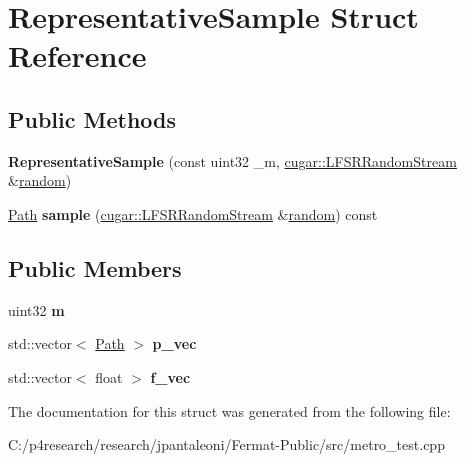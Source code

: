 \hypertarget{struct_representative_sample}{}\section{Representative\+Sample Struct Reference}
\label{struct_representative_sample}
\subsection*{Public Methods}
\begin{DoxyCompactItemize}
\item 
\mbox{\label{struct_representative_sample_a842ca3910b873725a562ff87373a0ad6}} 
{\bfseries Representative\+Sample} (const uint32 \+\_\+m, \hyperlink{structcugar_1_1_l_f_s_r_random_stream}{cugar\+::\+L\+F\+S\+R\+Random\+Stream} \&\hyperlink{group___sampling_module_gaec17bbbfd36295353081b7b4480d933d}{random})
\item 
\mbox{\label{struct_representative_sample_afc654849bcc19946b094c00f4381c99c}} 
\hyperlink{struct_path}{Path} {\bfseries sample} (\hyperlink{structcugar_1_1_l_f_s_r_random_stream}{cugar\+::\+L\+F\+S\+R\+Random\+Stream} \&\hyperlink{group___sampling_module_gaec17bbbfd36295353081b7b4480d933d}{random}) const
\end{DoxyCompactItemize}
\subsection*{Public Members}
\begin{DoxyCompactItemize}
\item 
\mbox{\label{struct_representative_sample_a59b60acbfdb408e987a3ca95f0f70ed2}} 
uint32 {\bfseries m}
\item 
\mbox{\label{struct_representative_sample_a74d81ff923c001721473bd2d73c59d10}} 
std\+::vector$<$ \hyperlink{struct_path}{Path} $>$ {\bfseries p\+\_\+vec}
\item 
\mbox{\label{struct_representative_sample_a53714e9217574d7fb766f0ebda2d67a3}} 
std\+::vector$<$ float $>$ {\bfseries f\+\_\+vec}
\end{DoxyCompactItemize}


The documentation for this struct was generated from the following file\+:\begin{DoxyCompactItemize}
\item 
C\+:/p4research/research/jpantaleoni/\+Fermat-\/\+Public/src/metro\+\_\+test.\+cpp\end{DoxyCompactItemize}
